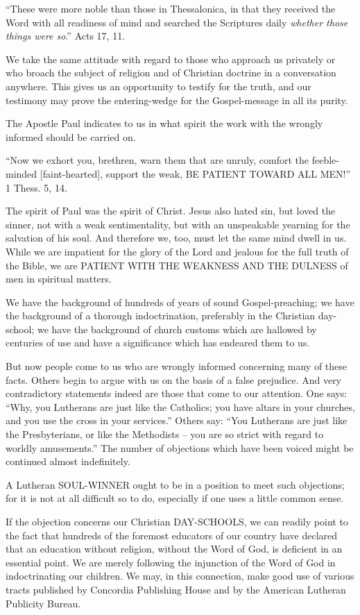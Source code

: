 \documentclass[
]{book}
\begin{document}
``These were more noble than those in Thessalonica, in that they received the Word with all readiness of mind and searched the Scriptures daily \emph{whether those things were so}.'' Acts 17, 11.

We take the same attitude with regard to those who approach us privately or who broach the subject of religion and of Christian doctrine in a conversation anywhere. This gives us an opportunity to testify for the truth, and our testimony may prove the entering-wedge for the Gospel-message in all its purity.

The Apostle Paul indicates to us in what spirit the work with the wrongly informed should be carried on.

``Now we exhort you, brethren, warn them that are unruly, comfort the feeble-minded {[}faint-hearted{]}, support the weak, BE PATIENT TOWARD ALL MEN!'' 1 Thess. 5, 14.

The spirit of Paul was the spirit of Christ. Jesus also hated sin, but loved the sinner, not with a weak sentimentality, but with an unspeakable yearning for the salvation of his soul. And therefore we, too, must let the same mind dwell in us. While we are impatient for the glory of the Lord and jealous for the full truth of the Bible, we are PATIENT WITH THE WEAKNESS AND THE DULNESS of men in spiritual matters.

We have the background of hundreds of years of sound Gospel-preaching; we have the background of a thorough indoctrination, preferably in the Christian day-school; we have the background of church customs which are hallowed by centuries of use and have a significance which has endeared them to us.

But now people come to us who are wrongly informed concerning many of these facts. Others begin to argue with us on the basis of a false prejudice. And very contradictory statements indeed are those that come to our attention. One says: ``Why, you Lutherans are just like the Catholics; you have altars in your churches, and you use the cross in your services.'' Others say: ``You Lutherans are just like the Presbyterians, or like the Methodists -- you are so strict with regard to worldly amusements.'' The number of objections which have been voiced might be continued almost indefinitely.

A Lutheran SOUL-WINNER ought to be in a position to meet such objections; for it is not at all difficult so to do, especially if one uses a little common sense.

If the objection concerns our Christian DAY-SCHOOLS, we can readily point to the fact that hundreds of the foremost educators of our country have declared that an education without religion, without the Word of God, is deficient in an essential point. We are merely following the injunction of the Word of God in indoctrinating our children. We may, in this connection, make good use of various tracts published by Concordia Publishing House and by the American Lutheran Publicity Bureau.
\end{document}
